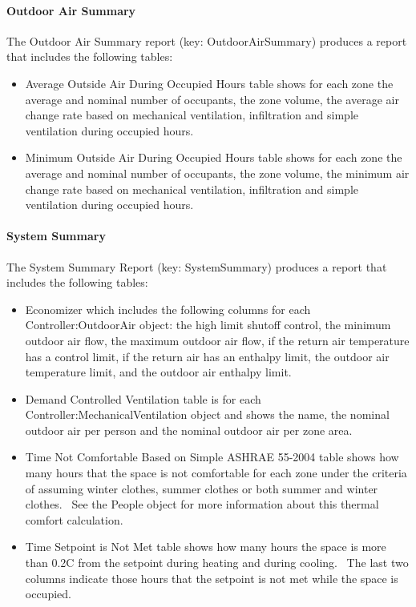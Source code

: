 \paragraph{Outdoor Air Summary}\label{outdoor-air-summary}

The Outdoor Air Summary report (key: OutdoorAirSummary) produces a report that includes the following tables:

\begin{itemize}
\item
  Average Outside Air During Occupied Hours table shows for each zone the average and nominal number of occupants, the zone volume, the average air change rate based on mechanical ventilation, infiltration and simple ventilation during occupied hours.
\item
  Minimum Outside Air During Occupied Hours table shows for each zone the average and nominal number of occupants, the zone volume, the minimum air change rate based on mechanical ventilation, infiltration and simple ventilation during occupied hours.
\end{itemize}

\paragraph{System Summary}\label{system-summary}

The System Summary Report (key: SystemSummary) produces a report that includes the following tables:

\begin{itemize}
\item
  Economizer which includes the following columns for each Controller:OutdoorAir object: the high limit shutoff control, the minimum outdoor air flow, the maximum outdoor air flow, if the return air temperature has a control limit, if the return air has an enthalpy limit, the outdoor air temperature limit, and the outdoor air enthalpy limit.
\item
  Demand Controlled Ventilation table is for each Controller:MechanicalVentilation object and shows the name, the nominal outdoor air per person and the nominal outdoor air per zone area.
\item
  Time Not Comfortable Based on Simple ASHRAE 55-2004 table shows how many hours that the space is not comfortable for each zone under the criteria of assuming winter clothes, summer clothes or both summer and winter clothes.~ See the People object for more information about this thermal comfort calculation.
\item
  Time Setpoint is Not Met table shows how many hours the space is more than 0.2C from the setpoint during heating and during cooling.~ The last two columns indicate those hours that the setpoint is not met while the space is occupied.
\end{itemize}

